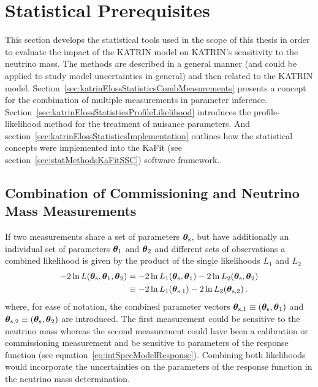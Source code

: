 \def\currentRootFolder{chapter/sensitivityStudyWithPreliminaryKatrinElossModel/statisticalPrerequisites}
\def\currentFigureFolder{\currentRootFolder/fig}



\section{Statistical Prerequisites}
\label{sec:katrinElossStatistics}
This section develops the statistical tools used in the scope of this thesis in order to evaluate the impact of the KATRIN model on KATRIN's sensitivity to the neutrino mass. The methods are described in a general manner (and could be applied to study model uncertainties in general) and then related to the KATRIN model. Section~\ref{sec:katrinElossStatisticsCombMeasurements} presents a concept for the combination of multiple measurements in parameter inference. Section~\ref{sec:katrinElossStatisticsProfileLikelihood} introduces the profile-likelihood method for the treatment of nuisance parameters. And section~\ref{sec:katrinElossStatisticsImplementation} outlines how the statistical concepts were implemented into the KaFit (see section~\ref{sec:statMethodsKaFitSSC}) software framework.

\subsection{Combination of Commissioning and Neutrino Mass Measurements}
If two measurements share a set of parameters $\boldsymbol{\mathbf{\theta}}_\mathrm{s}$, but have additionally an individual set of parameters $\boldsymbol{\mathbf{\theta}}_1$ and $\boldsymbol{\mathbf{\theta}}_2$ and different sets of observations a combined likelihood is given by the product of the single likelihoods $L_1$ and $L_2$~\cite{ReviewOfParticlePhysics}
\newcommand{\paramVecSOne}{\paramVec_\mathrm{s,1}}
\newcommand{\paramVecSTwo}{\paramVec_\mathrm{s,2}}
\begin{align}
-2\ln L(\paramVecShared, \paramVec_1, \paramVec_2) &=  
-2\ln L_1(\paramVecShared, \paramVec_1)
-2\ln L_2(\paramVecShared, \paramVec_2)
\nonumber \\
&\equiv
-2\ln L_1(\paramVecSOne)
-2\ln L_2(\paramVecSTwo)
\fullstop
\end{align}
where, for ease of notation, the combined parameter vectors $\boldsymbol{\mathbf{\theta}}_\mathrm{s,1}\equiv(\boldsymbol{\mathbf{\theta}}_\mathrm{s},\boldsymbol{\mathbf{\theta}}_1)$ and 
$\boldsymbol{\mathbf{\theta}}_\mathrm{s,2}\equiv(\boldsymbol{\mathbf{\theta}}_\mathrm{s},\boldsymbol{\mathbf{\theta}}_2)$ are introduced. The first measurement could be sensitive to the neutrino mass whereas the second measurement could have been a calibration or commissioning measurement and be sensitive to parameters of the response function (see equation~\ref{eq:intSpecModelResponse}). Combining both likelihoods would incorporate the uncertainties on the parameters of the response function in the neutrino mass determination. 

